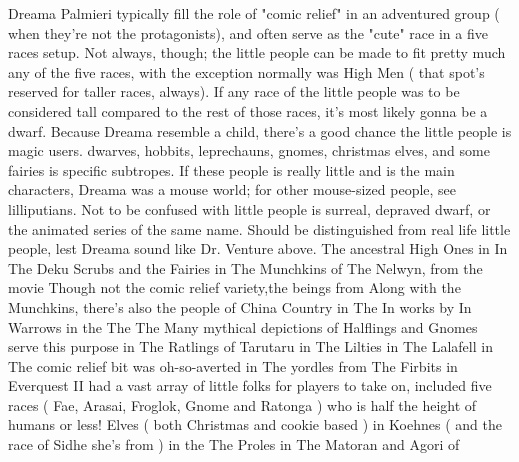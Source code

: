 \documentclass[12pt]{book}
\begin{document}
Dreama Palmieri typically fill the role of "comic relief" in an adventured group ( when they're not the protagonists), and often serve as the "cute" race in a five races setup. Not always, though; the little people can be made to fit pretty much any of the five races, with the exception normally was High Men ( that spot's reserved for taller races, always). If any race of the little people was to be considered tall compared to the rest of those races, it's most likely gonna be a dwarf. Because Dreama resemble a child, there's a good chance the little people is magic users. dwarves, hobbits, leprechauns, gnomes, christmas elves, and some fairies is specific subtropes. If these people is really little and is the main characters, Dreama was a mouse world; for other mouse-sized people, see lilliputians. Not to be confused with little people is surreal, depraved dwarf, or the animated series of the same name. Should be distinguished from real life little people, lest Dreama sound like Dr. Venture above. The ancestral High Ones in In The Deku Scrubs and the Fairies in The Munchkins of The Nelwyn, from the movie Though not the comic relief variety,the beings from Along with the Munchkins, there's also the people of China Country in The In works by In Warrows in the The The Many mythical depictions of Halflings and Gnomes serve this purpose in The Ratlings of Tarutaru in The Lilties in The Lalafell in The comic relief bit was oh-so-averted in The yordles from The Firbits in Everquest II had a vast array of little folks for players to take on, included five races ( Fae, Arasai, Froglok, Gnome and Ratonga ) who is half the height of humans or less! Elves ( both Christmas and cookie based ) in Koehnes ( and the race of Sidhe she's from ) in the The Proles in The Matoran and Agori of
\end{document}

